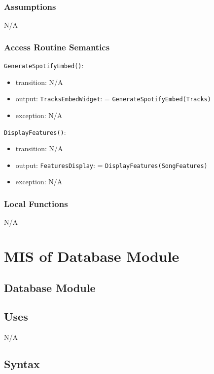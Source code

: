 \documentclass[12pt, titlepage]{article}
\begin{document}
\subsubsection{Assumptions}
N/A

\subsubsection{Access Routine Semantics}

\noindent \texttt{GenerateSpotifyEmbed()}:
\begin{itemize}
\item transition: N/A
\item output: \texttt{Tracks\textunderscore Embed\textunderscore Widget}: = \texttt{GenerateSpotifyEmbed(Tracks)}
\item exception: N/A
\end{itemize}

\noindent \texttt{DisplayFeatures()}:
\begin{itemize}
\item transition: N/A
\item output: \texttt{Features\textunderscore Display}: = \texttt{DisplayFeatures(Song\textunderscore Features)}
\item exception: N/A
\end{itemize}

\subsubsection{Local Functions}
N/A

\newpage

\section{MIS of Database Module} 

\subsection{Database Module}

\subsection{Uses}
N/A

\subsection{Syntax}
\end{document}
